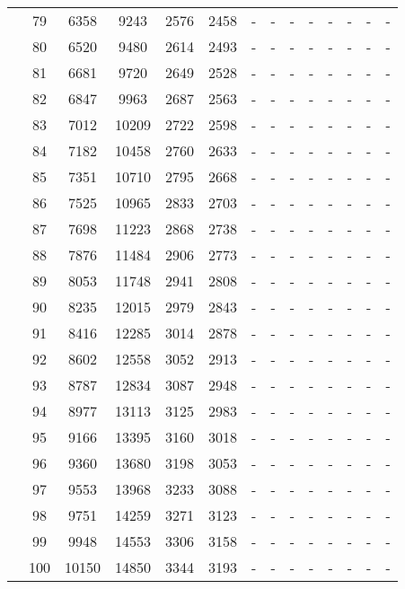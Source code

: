 \begin{table}[htb]
{\begin{tabular}{|c|c|c|c|c|c|c|c|c|c|c|c|c|c|}
 & 
79 & 6358 & 9243 & 2576 & 2458
 & - & -
 & - & -
 & - & -
 & - & -
 \\
 & 
80 & 6520 & 9480 & 2614 & 2493
 & - & -
 & - & -
 & - & -
 & - & -
 \\
 & 
81 & 6681 & 9720 & 2649 & 2528
 & - & -
 & - & -
 & - & -
 & - & -
 \\
 & 
82 & 6847 & 9963 & 2687 & 2563
 & - & -
 & - & -
 & - & -
 & - & -
 \\
 & 
83 & 7012 & 10209 & 2722 & 2598
 & - & -
 & - & -
 & - & -
 & - & -
 \\
 & 
84 & 7182 & 10458 & 2760 & 2633
 & - & -
 & - & -
 & - & -
 & - & -
 \\
 & 
85 & 7351 & 10710 & 2795 & 2668
 & - & -
 & - & -
 & - & -
 & - & -
 \\
 & 
86 & 7525 & 10965 & 2833 & 2703
 & - & -
 & - & -
 & - & -
 & - & -
 \\
 & 
87 & 7698 & 11223 & 2868 & 2738
 & - & -
 & - & -
 & - & -
 & - & -
 \\
 & 
88 & 7876 & 11484 & 2906 & 2773
 & - & -
 & - & -
 & - & -
 & - & -
 \\
 & 
89 & 8053 & 11748 & 2941 & 2808
 & - & -
 & - & -
 & - & -
 & - & -
 \\
 & 
90 & 8235 & 12015 & 2979 & 2843
 & - & -
 & - & -
 & - & -
 & - & -
 \\
 & 
91 & 8416 & 12285 & 3014 & 2878
 & - & -
 & - & -
 & - & -
 & - & -
 \\
 & 
92 & 8602 & 12558 & 3052 & 2913
 & - & -
 & - & -
 & - & -
 & - & -
 \\
 & 
93 & 8787 & 12834 & 3087 & 2948
 & - & -
 & - & -
 & - & -
 & - & -
 \\
 & 
94 & 8977 & 13113 & 3125 & 2983
 & - & -
 & - & -
 & - & -
 & - & -
 \\
 & 
95 & 9166 & 13395 & 3160 & 3018
 & - & -
 & - & -
 & - & -
 & - & -
 \\
 & 
96 & 9360 & 13680 & 3198 & 3053
 & - & -
 & - & -
 & - & -
 & - & -
 \\
 & 
97 & 9553 & 13968 & 3233 & 3088
 & - & -
 & - & -
 & - & -
 & - & -
 \\
 & 
98 & 9751 & 14259 & 3271 & 3123
 & - & -
 & - & -
 & - & -
 & - & -
 \\
 & 
99 & 9948 & 14553 & 3306 & 3158
 & - & -
 & - & -
 & - & -
 & - & -
 \\
 & 
100 & 10150 & 14850 & 3344 & 3193
 & - & -
 & - & -
 & - & -
 & - & -
 \\
\hline
\end{tabular}}
\end{table}